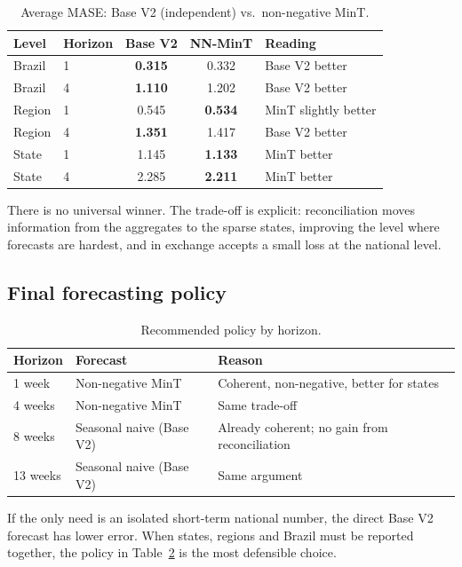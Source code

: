 \documentclass[12pt,a4paper]{article}
\begin{document}
\begin{table}[H]
\centering\small
\caption{Average MASE: Base V2 (independent) vs.\ non-negative MinT.}\label{tab:hier}
\begin{tabular}{llccl}
\toprule
Level & Horizon & Base V2 & NN-MinT & Reading \\
\midrule
Brazil & 1 & \textbf{0.315} & 0.332 & Base V2 better \\
Brazil & 4 & \textbf{1.110} & 1.202 & Base V2 better \\
Region & 1 & 0.545 & \textbf{0.534} & MinT slightly better \\
Region & 4 & \textbf{1.351} & 1.417 & Base V2 better \\
State  & 1 & 1.145 & \textbf{1.133} & MinT better \\
State  & 4 & 2.285 & \textbf{2.211} & MinT better \\
\bottomrule
\end{tabular}
\end{table}

There is no universal winner. The trade-off is explicit: reconciliation moves information from the aggregates to the sparse states, improving the level where forecasts are hardest, and in exchange accepts a small loss at the national level.

\subsection{Final forecasting policy}
\begin{table}[H]
\centering\small
\caption{Recommended policy by horizon.}\label{tab:policy}
\begin{tabular}{lll}
\toprule
Horizon & Forecast & Reason \\
\midrule
1 week & Non-negative MinT & Coherent, non-negative, better for states \\
4 weeks & Non-negative MinT & Same trade-off \\
8 weeks & Seasonal naive (Base V2) & Already coherent; no gain from reconciliation \\
13 weeks & Seasonal naive (Base V2) & Same argument \\
\bottomrule
\end{tabular}
\end{table}

If the only need is an isolated short-term national number, the direct Base V2 forecast has lower error. When states, regions and Brazil must be reported together, the policy in Table~\ref{tab:policy} is the most defensible choice.
\end{document}
